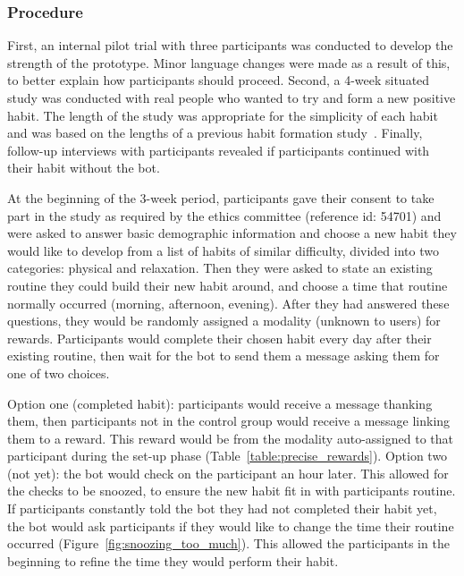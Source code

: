 \subsubsection{Procedure}
First, an internal pilot trial with three participants was conducted to develop the strength of the prototype. Minor language changes were made as a result of this, to better explain how participants should proceed. Second, a  4-week situated study was conducted with real people who wanted to try and form a new positive habit. The length of the study was appropriate for the simplicity of each habit and was based on the lengths of a previous habit formation study~\cite{article_beyond_self_tracking_designing_apps}. Finally, follow-up interviews with participants revealed if participants continued with their habit without the bot.

At the beginning of the 3-week period, participants gave their consent to take part in the study as required by the ethics committee (reference id: 54701) and were asked to answer basic demographic information and choose a new habit they would like to develop from a list of habits of similar difficulty, divided into two categories: physical and relaxation. Then they were asked to state an existing routine they could build their new habit around, and choose a time that routine normally occurred (morning, afternoon, evening). After they had answered these questions, they would be randomly assigned a modality (unknown to users) for rewards. Participants would complete their chosen habit every day after their existing routine, then wait for the bot to send them a message asking them for one of two choices.

Option one (completed habit): participants would receive a message thanking them, then participants not in the control group would receive a message linking them to a reward. This reward would be from the modality auto-assigned to that participant during the set-up phase (Table~\ref{table:precise_rewards}). Option two (not yet): the bot would check on the participant an hour later. This allowed for the checks to be snoozed, to ensure the new habit fit in with participants routine. If participants constantly told the bot they had not completed their habit yet, the bot would ask participants if they would like to change the time their routine occurred (Figure~\ref{fig:snoozing_too_much}). This allowed the participants in the beginning to refine the time they would perform their habit.


